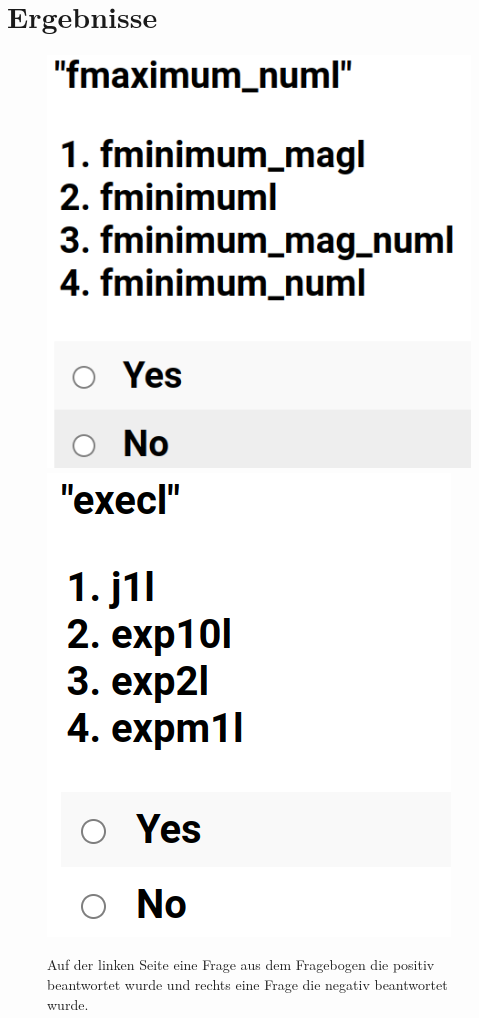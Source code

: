 \documentclass[12pt,letterpaper,ngerman]{article}
\begin{document}
\pagebreak


\section{Ergebnisse}

\begin{figure}
  \begin{center}
    \includegraphics[scale=0.3]{abb/survey-example-positive.png}
    \includegraphics[scale=0.3]{abb/survey-example-negative.png}
  \end{center}
  \caption{
    Auf der linken Seite eine Frage aus dem Fragebogen die positiv
    beantwortet wurde und rechts eine Frage die negativ
    beantwortet wurde.
  }
\end{figure}
\end{document}
